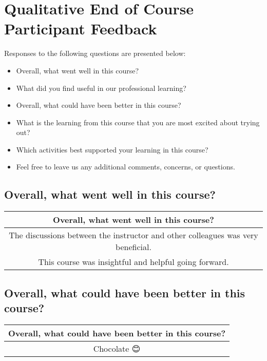 \documentclass[10,a4paperpaper,]{article}
\begin{document}
\section{Qualitative End of Course Participant Feedback}

Responses to the following questions are presented below:

\begin{itemize}
\item
  Overall, what went well in this course?
\item
  What did you find useful in our professional learning?
\item
  Overall, what could have been better in this course?
\item
  What is the learning from this course that you are most excited about
  trying out?
\item
  Which activities best supported your learning in this course?
\item
  Feel free to leave us any additional comments, concerns, or questions.
\end{itemize}

\subsection{Overall, what went well in this course?}

\captionsetup[table]{labelformat=empty,skip=1pt}
\begin{longtable}{c}
\toprule
Overall, what went well in this course? \\ 
\midrule
The discussions between the instructor and other colleagues was very beneficial. \\ 
This course was insightful and helpful going forward. \\ 
\bottomrule
\end{longtable}

\subsection{Overall, what could have been better in this course?}

\captionsetup[table]{labelformat=empty,skip=1pt}
\begin{longtable}{c}
\toprule
Overall, what could have been better in this course? \\ 
\midrule
Chocolate 😊 \\ 
\bottomrule
\end{longtable}
\end{document}
